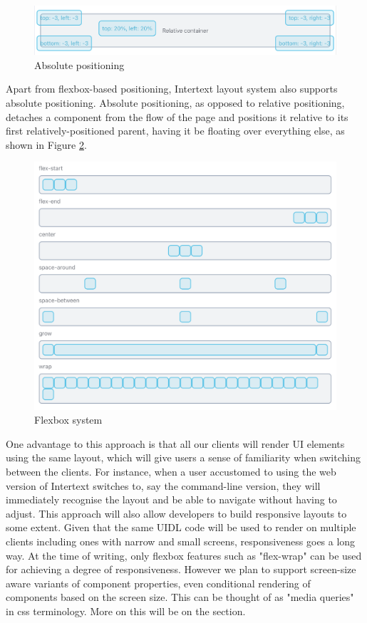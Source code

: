\begin{figure}[H]
  \centering
  \includegraphics[width=13cm]{thesis/paper/images/absolute.png}
  \caption{Absolute positioning}%
  \label{fig:flexbox_props}%
\end{figure}

Apart from flexbox-based positioning, Intertext layout system also supports absolute positioning. Absolute positioning, as opposed to relative positioning, detaches a component from the flow of the page and positions it relative to its first relatively-positioned parent, having it be floating over everything else, as shown in Figure \ref{fig:absolute_positioning}.

\begin{figure}
  \centering
  \includegraphics[width=13cm]{thesis/paper/images/responsive.png}
  \caption{Flexbox system}%
  \label{fig:absolute_positioning}%
\end{figure}

One advantage to this approach is that all our clients will render UI elements using the same layout, which will give users a sense of familiarity when switching between the clients. For instance, when a user accustomed to using the web version of Intertext switches to, say the command-line version, they will immediately recognise the layout and be able to navigate without having to adjust. This approach will also allow developers to build responsive layouts to some extent. Given that the same UIDL code will be used to render on multiple clients including ones with narrow and small screens, responsiveness goes a long way. At the time of writing, only flexbox features such as "flex-wrap" can be used for achieving a degree of responsiveness. However we plan to support screen-size aware variants of component properties, even conditional rendering of components based on the screen size. This can be thought of as "media queries" in css terminology. More on this will be on the  section.

